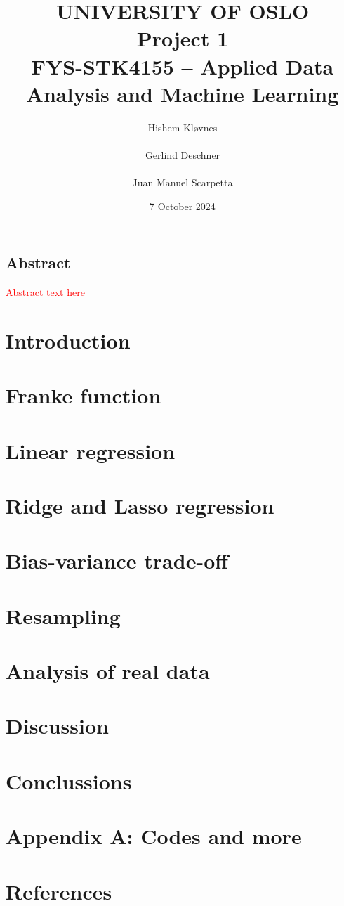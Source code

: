 \documentclass[11pt, letterpaper, titlepage]{article}
\title{
 \textbf{\LARGE UNIVERSITY OF OSLO} \\
\vspace{37mm}
\textbf{\Large Project 1}\\
\vspace{7mm}
\Large FYS-STK4155 – Applied Data Analysis and Machine Learning
\vspace{25mm}
}
\author{\Large Hishem Kløvnes \\ \\
        \Large Gerlind Deschner\\ \\
        \Large Juan Manuel Scarpetta
        \vspace{45mm}
        }
\date{\Large 7 October 2024} %
\begin{document}
\maketitle
\tableofcontents
\newpage

\begin{center}
  \subsection*{Abstract}  
\end{center}
\textcolor{red}{Abstract text here} \lipsum[5]
\bigskip
\bigskip




\section{Introduction}
\lipsum[2-4]

\section{Franke function}
\section{Linear regression}
\section{Ridge and Lasso regression}
\section{Bias-variance trade-off}
\section{Resampling}
\section{Analysis of real data}

\section*{Discussion}
\section*{Conclussions}

\section*{Appendix A: Codes and more}

\bigskip
\section*{References}
\end{document}
